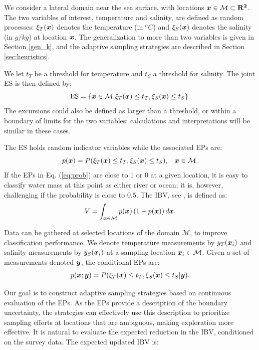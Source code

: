 \documentclass[aoas]{imsart}
\begin{document}
We consider a lateral domain near the sea surface, with locations
${\boldsymbol x} \in \mathcal{M} \subset \mathbf{R^2}$. The two variables of
interest, temperature and salinity, are defined as random processes:
$\xi_T({\boldsymbol x})$ denotes the temperature (in $^o C$) and $\xi_S({\boldsymbol x})$
denotes the salinity (in $g/kg$) at location ${\boldsymbol x}$. The generalization
to more than two variables is given in Section \ref{gen_k}, and the
adaptive sampling strategies are described in Section
\ref{sec:heuristics}.

We let $t_T$ be a threshold for temperature and $t_S$ a threshold for
salinity. The joint ES is then defined by:
\begin{equation}\label{ES}
     \mbox{ES} = \{\bx \in \mathcal{M} | \xi_T(\bx) \leq t_T,\xi_S(\bx) \leq t_S\}.
\end{equation}
The excursions could also be defined as larger than a threshold, or
within a boundary of limits for the two variables; calculations and
interpretations will be similar in these cases.

The ES holds random indicator variables while the associated EPs are: 
\begin{equation}\label{eq:prob}
  p(\bx) = P(\xi_T(\bx) \leq t_T, \xi_S(\bx) \leq t_S), \hspace{3mm} \bx \in \mathcal{M}.
\end{equation}
If the EPs in Eq. (\ref{eq:prob}) are
close to $1$ or $0$ at a given location, it is easy to classify water mass at this point as either river or ocean; it is, however,
challenging if the probability is close to $0.5$. 
The IBV, see \cite{bect2019}, is defined as:
\begin{equation}\label{measVAR}
    V = \int_{\bx \in \mathcal{M}} p(\bx) \left(1-p(\bx)\right) d\bx.
\end{equation}

Data can be
gathered at selected locations of the domain $\mathcal{M}$, to improve
classification performance. We denote temperature measurements by
$y_{T}({\boldsymbol x}_i)$ and salinity measurements by $y_{S}({\boldsymbol x}_i)$ at a
sampling location ${\boldsymbol x}_i \in \mathcal{M}$. Given a set of
measurements denoted ${\boldsymbol y}$, the conditional EPs are:
\begin{equation}\label{eq:post_ep}
 p(\bx;\by) = P(\xi_T(\bx) \leq t_T, \xi_S(\bx) \leq t_S |\by). 
\end{equation}

Our goal is to construct adaptive sampling strategies based on
continuous evaluation of the EPs. As the EPs provide a description of
the boundary uncertainty, the strategies can effectively use this
description to prioritize sampling efforts at locations that are
ambiguous, making exploration more effective. It is natural to
evaluate the expected reduction in the IBV, conditioned on the survey
data. The expected updated IBV is:
\end{document}
